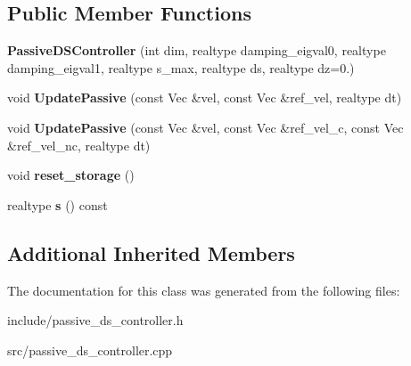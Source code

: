 \subsection*{Public Member Functions}
\begin{DoxyCompactItemize}
\item 
\hypertarget{classPassiveDSController_a8f5ced43f2163e78b5fb0c3a84711e18}{{\bfseries Passive\+D\+S\+Controller} (int dim, realtype damping\+\_\+eigval0, realtype damping\+\_\+eigval1, realtype s\+\_\+max, realtype ds, realtype dz=0.)}\label{classPassiveDSController_a8f5ced43f2163e78b5fb0c3a84711e18}

\item 
\hypertarget{classPassiveDSController_a332c50c135197baf1f29f5379173343c}{void {\bfseries Update\+Passive} (const Vec \&vel, const Vec \&ref\+\_\+vel, realtype dt)}\label{classPassiveDSController_a332c50c135197baf1f29f5379173343c}

\item 
\hypertarget{classPassiveDSController_a08601ac564a6b04327db651922990515}{void {\bfseries Update\+Passive} (const Vec \&vel, const Vec \&ref\+\_\+vel\+\_\+c, const Vec \&ref\+\_\+vel\+\_\+nc, realtype dt)}\label{classPassiveDSController_a08601ac564a6b04327db651922990515}

\item 
\hypertarget{classPassiveDSController_ae764fffc8251d99def95dfbfa6013de6}{void {\bfseries reset\+\_\+storage} ()}\label{classPassiveDSController_ae764fffc8251d99def95dfbfa6013de6}

\item 
\hypertarget{classPassiveDSController_ad42b8c3c2b268d236dc4082c0bf43fdd}{realtype {\bfseries s} () const }\label{classPassiveDSController_ad42b8c3c2b268d236dc4082c0bf43fdd}

\end{DoxyCompactItemize}
\subsection*{Additional Inherited Members}


The documentation for this class was generated from the following files\+:\begin{DoxyCompactItemize}
\item 
include/passive\+\_\+ds\+\_\+controller.\+h\item 
src/passive\+\_\+ds\+\_\+controller.\+cpp\end{DoxyCompactItemize}

